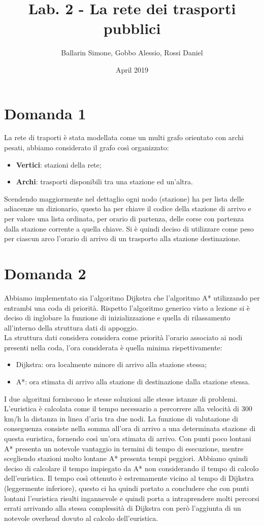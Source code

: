 \documentclass{article}
\title{Lab. 2 - La rete dei trasporti pubblici}
\author{Ballarin Simone, Gobbo Alessio, Rossi Daniel}
\date{April 2019}
\begin{document}
\maketitle

\section*{Domanda 1}
La rete di traporti è stata modellata come un multi grafo orientato con archi pesati, abbiamo considerato il grafo così organizzato:
\begin{itemize}
	\item \textbf{Vertici}: stazioni della rete;
	\item \textbf{Archi}: trasporti disponibili tra una stazione ed un'altra.
\end{itemize}

Scendendo maggiormente nel dettaglio ogni nodo (stazione) ha per lista delle adiacenze un dizionario, questo ha per chiave il codice della stazione di arrivo e per valore una lista ordinata, per orario di partenza, delle corse con partenza dalla stazione corrente a quella chiave.
Si è quindi deciso di utilizzare come peso per ciascun arco l'orario di arrivo di un trasporto alla stazione destinazione.

\section*{Domanda 2}
Abbiamo implementato sia l'algoritmo Dijkstra che l'algoritmo A* utilizzando per entrambi una coda di priorità.
Rispetto l'algoritmo generico visto a lezione si è deciso di inglobare la funzione di inizializzazione e quella di rilassamento all'interno della struttura dati di appoggio.\\
La struttura dati considera considera come priorità l'orario associato ai nodi presenti nella coda, l'ora considerata è quella minima rispettivamente:
\begin{itemize}
	\item Dijkstra: ora localmente minore di arrivo alla stazione stessa;
	\item A*: ora stimata di arrivo alla stazione di destinazione dalla stazione stessa.
\end{itemize}
I due algoritmi forniscono le stesse soluzioni alle stesse istanze di problemi. L'euristica è calcolata come il tempo necessario a percorrere alla velocità di 300 km/h la distanza in linea d'aria tra due nodi. La funzione di valutazione di conseguenza consiste nella somma all'ora di arrivo a una determinata stazione di questa euristica, fornendo così un'ora stimata di arrivo. Con punti poco lontani A* presenta un notevole vantaggio in termini di tempo di esecuzione, mentre scegliendo stazioni molto lontane  A* presenta tempi peggiori. Abbiamo quindi deciso di calcolare il tempo impiegato da A* non considerando il tempo di calcolo dell'euristica. Il tempo così ottenuto è estremamente vicino al tempo di Dijkstra (leggermente inferiore), questo ci ha quindi portato a concludere che con punti lontani l'euristica risulti ingannevole e quindi porta a intraprendere molti percorsi errati arrivando alla stessa complessità di Dijkstra con però l'aggiunta di un notevole overhead dovuto al calcolo dell'euristica.
\newpage
\end{document}
